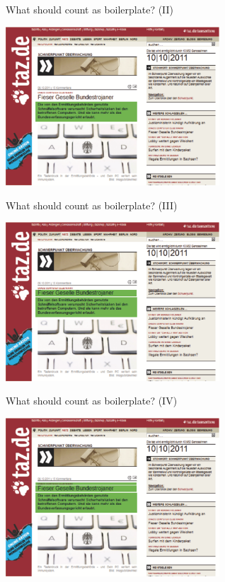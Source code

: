 \begin{frame}
  {What should count as boilerplate? (II)}
  \begin{center}
    \includegraphics[width=8cm]{graphicswcc/webseite-b}
  \end{center}
\end{frame}


\begin{frame}
  {What should count as boilerplate? (III)}
  \begin{center}
    \includegraphics[width=8cm]{graphicswcc/webseite-c}
  \end{center}
\end{frame}



\begin{frame}
  {What should count as boilerplate? (IV)}
  \begin{center}
    \includegraphics[width=8cm]{graphicswcc/webseite-d}
  \end{center}
\end{frame}


